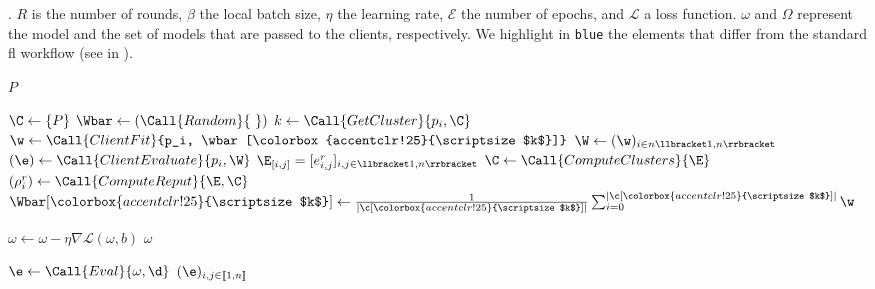 \begin{algorithm}
  \caption{
    \thecontrib.
    $R$ is the number of rounds, $\beta$ the local batch size, $\eta$ the learning rate, $\mathcal{E}$ the number of epochs, and $\mathcal{L}$ a loss function.
    $\omega$ and $\Omega$ represent the model and the set of models that are passed to the clients, respectively.
    We highlight in \colorbox{accentclr!25}{\texttt{blue}} the elements that differ from the standard \gls{fl} workflow (see  in ).
    \label{alg:xeval}
  }
  \setlength{\fboxsep}{1pt}
  \newcommand{\hl}[1]{\colorbox{accentclr!25}{\scriptsize $#1$}}
  \begin{small}
    \begin{algorithmic}[1]
      \Require $P$
  
\BeginBox[fill=accentclr!25]
        \State $ \C \gets \{ P \}$
\EndBox
        \State $ \Wbar \gets (\Call{Random}{\ })$
      \EndWith
      \Statex
\BeginBox[fill=accentclr!25]
          \State $k \gets \Call{GetCluster}{p_i, \C}$
\EndBox
          \State $\w \gets \Call{ClientFit}{p_i, \wbar[\hl{k}]}$
        \EndFor
        \Statex
\BeginBox[fill=accentclr!25]
        \State $ \W \gets (\w)_{i \in n \llbracket 1,n \rrbracket} $ 
\EndBox
        \Statex
\BeginBox[fill=accentclr!25]
          \State $(\e) \gets \Call{ClientEvaluate}{p_i, \W}$
        \EndFor
        \State $ \E_{[i,j]} = [e_{i,j}^r]_{i,j \in \llbracket 1,n \rrbracket} $
\EndBox
        \Statex
\BeginBox[fill=accentclr!25]
        \State $ \C \gets \Call{ComputeClusters}{\E}$              
        \ForAll{$  \c \in \C $}
          \State $ (\rho_i^r) \gets \Call{ComputeReput}{\E, \C}$   
\EndBox
          \State $ \Wbar[\hl{k}] \gets \frac{1}{|\c[\hl{k}]|} \sum_{i=0}^{|\c[\hl{k}]|} \w$
        \EndFor
      \EndFor
  
      \Statex %
            \State $ \omega \gets \omega - \eta \nabla \mathcal{L}(\omega,b) $
          \EndFor
        \EndFor
        \Statex
        \State \Return $\omega$
      \EndFunction
  
      \Statex %
\BeginBox[fill=accentclr!25]
       
          \State $ \e \gets \Call{Eval}{\omega, \d}$
        \EndFor
        \State \Return $(\e)_{i,j \in [\![ 1,n ]\!]}$
      \EndFunction
\EndBox
    \end{algorithmic}
  \end{small}
\end{algorithm}

